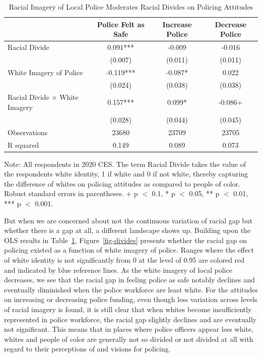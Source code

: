 \documentclass[
  12pt,
]{article}
\begin{document}
\hypertarget{tbl-divides}{}
\begin{table}
\caption{\label{tbl-divides}Racial Imagery of Local Police Moderates Racial Divides on Policing
Attitudes }\tabularnewline

\centering
\begin{threeparttable}
\begin{tabular}[t]{lccc}
\toprule
  & Police Felt as Safe & Increase Police & Decrease Police\\
\midrule
Racial Divide & 0.091*** & -0.009 & -0.016\\
 & (0.007) & (0.011) & (0.011)\\
White Imagery of Police & -0.119*** & -0.087* & 0.022\\
 & (0.024) & (0.038) & (0.038)\\
Racial Divide × White Imagery & 0.157*** & 0.099* & -0.086+\\
 & (0.028) & (0.044) & (0.045)\\
\midrule
Observations & 23680 & 23709 & 23705\\
R squared & 0.149 & 0.089 & 0.073\\
\bottomrule
\end{tabular}
\begin{tablenotes}
\item Note: All respondents in 2020 CES. The term Racial Divide takes the value of the respondents white identity, 1 if white and 0 if not white, thereby capturing the difference of whites on policing attitudes as compared to people of color. Robust standard errors in parentheses. + p $<$ 0.1, * p $<$ 0.05, ** p $<$ 0.01, *** p $<$ 0.001.
\end{tablenotes}
\end{threeparttable}
\end{table}

But when we are concerned about not the continuous variation of racial
gap but whether there is a gap at all, a different landscape shows up.
Building upon the OLS results in Table~\ref{tbl-divides},
Figure~\ref{fig-divides} presents whether the racial gap on policing
existed as a function of white imagery of police. Ranges where the
effect of white identity is not significantly from 0 at the level of
0.95 are colored red and indicated by blue reference lines. As the white
imagery of local police decreases, we see that the racial gap in feeling
police as safe notably declines and eventually diminished when the
police workforce are least white. For the attitudes on increasing or
decreasing police funding, even though less variation across levels of
racial imagery is found, it is still clear that when whites become
insufficiently represented in police workforce, the racial gap slightly
declines and are eventually not significant. This means that in places
where police officers appear less white, whites and people of color are
generally not so divided or not divided at all with regard to their
perceptions of and visions for policing.
\end{document}
